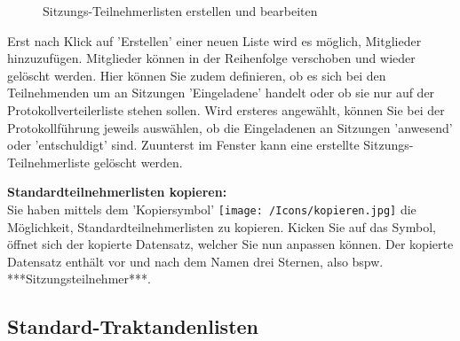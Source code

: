 \begin{figure}[H]
\end{figure}

\begin{figure}[H]
\vspace{-25pt}
\caption{Sitzungs-Teilnehmerlisten erstellen und bearbeiten}
\end{figure}

Erst nach Klick auf 'Erstellen' einer neuen Liste wird es möglich, Mitglieder hinzuzufügen. Mitglieder können in der Reihenfolge verschoben und wieder gelöscht werden. Hier können Sie zudem definieren, ob es sich bei den Teilnehmenden um an Sitzungen 'Eingeladene' handelt oder ob sie nur auf der Protokollverteilerliste stehen sollen. Wird ersteres angewählt, können Sie bei der Protokollführung jeweils auswählen, ob die Eingeladenen an Sitzungen 'anwesend' oder 'entschuldigt' sind. Zuunterst im Fenster kann eine erstellte Sitzungs-Teilnehmerliste gelöscht werden.

\vspace{\baselineskip}

\textbf{Standardteilnehmerlisten kopieren:}\\
Sie haben mittels dem 'Kopiersymbol' \texttt{[image: /Icons/kopieren.jpg]} die Möglichkeit, Standardteilnehmerlisten zu kopieren. Kicken Sie auf das Symbol, öffnet sich der kopierte Datensatz, welcher Sie nun anpassen können. Der kopierte Datensatz enthält vor und nach dem Namen drei Sternen, also bspw. ***Sitzungsteilnehmer***.

\clearpage
\subsection{Standard-Traktandenlisten}

